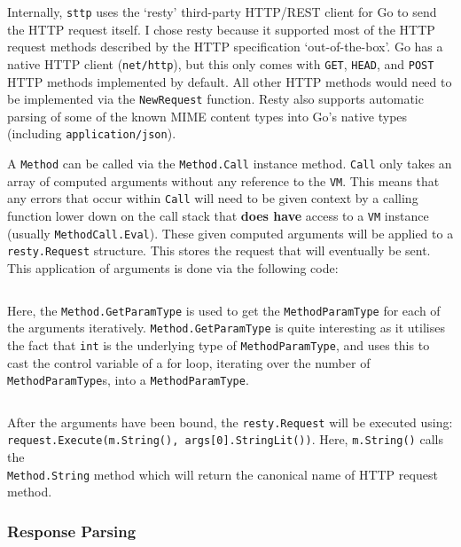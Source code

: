 Internally, \verb|sttp| uses the `resty' third-party HTTP/REST client for Go\textsuperscript{\cite{resty}} to send the HTTP request itself. I chose resty because it supported most of the HTTP request methods described by the HTTP specification `out-of-the-box'. Go has a native HTTP client (\verb|net/http|), but this only comes with \verb|GET|, \verb|HEAD|, and \verb|POST| HTTP methods implemented by default. All other HTTP methods would need to be implemented via the \verb|NewRequest| function. Resty also supports automatic parsing of some of the known MIME content types into Go's native types (including \verb|application/json|).

A \verb|Method| can be called via the \verb|Method.Call| instance method. \verb|Call| only takes an array of computed arguments without any reference to the \verb|VM|. This means that any errors that occur within \verb|Call| will need to be given context by a calling function lower down on the call stack that \textbf{does have} access to a \verb|VM| instance (usually \verb|MethodCall.Eval|). These given computed arguments will be applied to a \verb|resty.Request| structure. This stores the request that will eventually be sent. This application of arguments is done via the following code:

\inputminted[firstline=169, lastline=182, autogobble, breaklines, tabsize=4]{go}{../../src/eval/methods.go}

Here, the \verb|Method.GetParamType| is used to get the \verb|MethodParamType| for each of the arguments iteratively. \verb|Method.GetParamType| is quite interesting as it utilises the fact that \texttt{int} is the underlying type of \verb|MethodParamType|, and uses this to cast the control variable of a for loop, iterating over the number of \verb|MethodParamType|s, into a \verb|MethodParamType|.

\inputminted[firstline=151, lastline=164, autogobble, breaklines, tabsize=4]{go}{../../src/eval/methods.go}

After the arguments have been bound, the \verb|resty.Request| will be executed using: \\\texttt{request.Execute(m.String(), args[0].StringLit())}. Here, \verb|m.String()| calls the \\\verb|Method.String| method which will return the canonical name of HTTP request method.

\subsubsection{Response Parsing}

